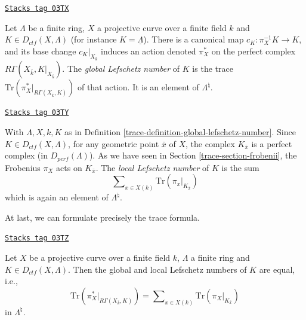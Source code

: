 \begin{definition}
\label{trace-definition-global-lefschetz-number}
\href{https://stacks.math.columbia.edu/tag/03TX}{\texttt{Stacks tag 03TX}}

Let $\Lambda$ be a finite ring, $X$ a projective curve over a finite field $k$
and $K \in D_{ctf}(X, \Lambda)$ (for instance $K = \underline\Lambda$).
There is a canonical map $c_K : \pi_X^{-1}K \to K$, and its base change
$c_K|_{X_{\bar k}}$ induces an action denoted $\pi_X^*$ on the perfect
complex $R\Gamma(X_{\bar k}, K|_{X_{\bar k}})$. The
{\it global Lefschetz number} of $K$ is the trace
$\text{Tr}(\pi_X^* |_{R\Gamma(X_{\bar k}, K)})$ of that action.
It is an element of $\Lambda^\natural$.
\end{definition}

\begin{definition}
\label{trace-definition-local-lefschetz-number}
\href{https://stacks.math.columbia.edu/tag/03TY}{\texttt{Stacks tag 03TY}}

With $\Lambda, X, k, K$ as in
Definition \ref{trace-definition-global-lefschetz-number}.
Since $K\in D_{ctf}(X, \Lambda)$, for any geometric point $\bar x$ of $X$,
the complex $K_{\bar x}$ is a perfect complex (in $D_{perf}(\Lambda)$). As we
have seen in Section \ref{trace-section-frobenii}, the Frobenius $\pi_X$ acts on
$K_{\bar x}$. The {\it local Lefschetz number} of $K$ is the sum
$$
\sum\nolimits_{x\in X(k)} \text{Tr}(\pi_x |_{K_{\overline{x}}})
$$
which is again an element of $\Lambda^\natural$.
\end{definition}

At last, we can formulate precisely the trace formula.

\begin{theorem}

\label{trace-theorem-trace}
\href{https://stacks.math.columbia.edu/tag/03TZ}{\texttt{Stacks tag 03TZ}}

Let $X$ be a projective curve over a finite field $k$, $\Lambda$ a finite ring
and $K \in D_{ctf}(X, \Lambda)$. Then the global and local Lefschetz numbers
of $K$ are equal, i.e.,
\begin{equation}
\label{equation-trace-formula}
\text{Tr}(\pi^*_X |_{R\Gamma(X_{\bar k}, K)})
=
\sum\nolimits_{x\in X(k)} \text{Tr}(\pi_X |_{K_{\bar x}})
\end{equation}
in $\Lambda^\natural$.
\end{theorem}

